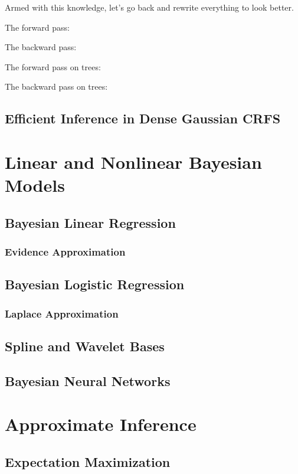 \documentclass[12pt]{article}
\begin{document}
Armed with this knowledge, let's go back and rewrite everything to look better.

The forward pass:

The backward pass:

The forward pass on trees:

The backward pass on trees:

\subsection{Efficient Inference in Dense Gaussian CRFS}

\section{Linear and Nonlinear Bayesian Models}

\subsection{Bayesian Linear Regression}

\subsubsection{Evidence Approximation}

\subsection{Bayesian Logistic Regression}

\subsubsection{Laplace Approximation}

\subsection{Spline and Wavelet Bases}

\subsection{Bayesian Neural Networks}
\section{Approximate Inference}

\subsection{Expectation Maximization}
\end{document}
